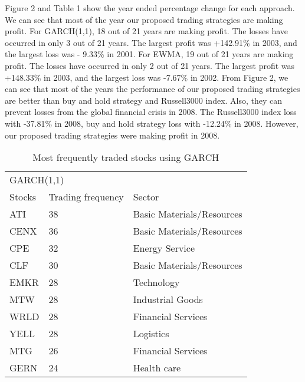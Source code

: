 \documentclass[11pts]{article}
\begin{document}
Figure 2 and Table 1 show the year ended percentage change for each approach. We can see that most of the year our proposed trading strategies are making profit. For GARCH(1,1), 18 out of 21 years are making profit. The losses have occurred in only 3 out of 21 years. The largest profit was +142.91\% in 2003, and the largest loss was  - 9.33\% in 2001. For EWMA, 19 out of 21 years are making profit. The losses have occurred in only 2 out of 21 years. The largest profit was +148.33\% in 2003, and the largest loss was -7.67\% in 2002. From Figure 2, we can see that most of the years the performance of our proposed trading strategies are better than buy and hold strategy and Russell3000 index. Also, they can prevent losses from the global financial crisis in 2008. The Russell3000 index loss with -37.81\% in 2008, buy and hold strategy loss with -12.24\% in 2008. However, our proposed trading strategies were making profit in 2008.

\begin{table}[H]
\centering
\begin{tabular}{lll}
\hline
\multicolumn{3}{l}{GARCH(1,1)}                         \\
Stocks & Trading frequency & Sector                    \\ \hline
ATI    & 38                & Basic Materials/Resources \\
CENX   & 36                & Basic Materials/Resources \\
CPE    & 32                & Energy Service            \\
CLF    & 30                & Basic Materials/Resources \\
EMKR   & 28                & Technology                \\
MTW    & 28                & Industrial Goods          \\
WRLD   & 28                & Financial Services        \\
YELL   & 28                & Logistics                 \\
MTG    & 26                & Financial Services        \\
GERN   & 24                & Health care               \\ \hline
\end{tabular}
\caption{Most frequently traded stocks using GARCH}
\label{tab:2}
\end{table}
\end{document}
